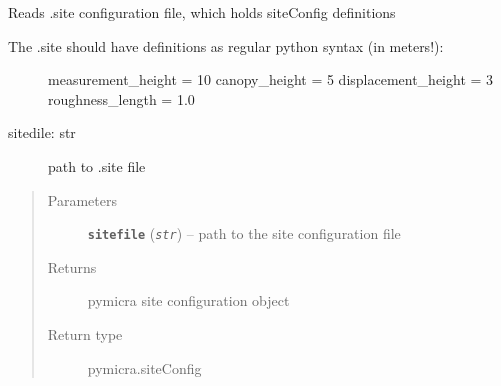 \documentclass[a4paper,10pt,oneside]{sphinxmanual}
\begin{document}

\begin{fulllineitems}
\label{pymicra:pymicra.io.read_site}
Reads .site configuration file, which holds siteConfig definitions
\begin{description}
\item[{The .site should have definitions as regular python syntax (in meters!):}] \leavevmode
measurement\_height  = 10
canopy\_height       = 5
displacement\_height = 3
roughness\_length    = 1.0

\item[{sitedile: str}] \leavevmode
path to .site file

\end{description}
\begin{quote}\begin{description}
\item[{Parameters}] \leavevmode
\textbf{\texttt{sitefile}} (\emph{\texttt{str}}) -- path to the site configuration file

\item[{Returns}] \leavevmode
pymicra site configuration object

\item[{Return type}] \leavevmode
pymicra.siteConfig

\end{description}\end{quote}

\end{fulllineitems}

\end{document}
